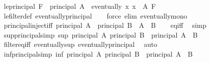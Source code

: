 \begin{isabellebody}
\endisatagproof
{\isafoldproof}%
%
\isadelimproof
\isanewline
%
\endisadelimproof
\isanewline
{}\isamarkupfalse%
\ le{\isacharunderscore}{\kern0pt}principal{\isacharcolon}{\kern0pt}\ {\isachardoublequoteopen}F\ {\isasymle}\ principal\ A\ {\isasymlongleftrightarrow}\ eventually\ {\isacharparenleft}{\kern0pt}{\isasymlambda}x{\isachardot}{\kern0pt}\ x\ {\isasymin}\ A{\isacharparenright}{\kern0pt}\ F{\isachardoublequoteclose}\isanewline
%
\isadelimproof
\ \ %
\endisadelimproof
%
\isatagproof
{}\isamarkupfalse%
\ le{\isacharunderscore}{\kern0pt}filter{\isacharunderscore}{\kern0pt}def\ eventually{\isacharunderscore}{\kern0pt}principal\isanewline
\ \ \isamarkupfalse%
\ {\isacharparenleft}{\kern0pt}force\ elim{\isacharcolon}{\kern0pt}\ eventually{\isacharunderscore}{\kern0pt}mono{\isacharparenright}{\kern0pt}%
\endisatagproof
{\isafoldproof}%
%
\isadelimproof
\isanewline
%
\endisadelimproof
\isanewline
{}\isamarkupfalse%
\ principal{\isacharunderscore}{\kern0pt}inject{\isacharbrackleft}{\kern0pt}iff{\isacharbrackright}{\kern0pt}{\isacharcolon}{\kern0pt}\ {\isachardoublequoteopen}principal\ A\ {\isacharequal}{\kern0pt}\ principal\ B\ {\isasymlongleftrightarrow}\ A\ {\isacharequal}{\kern0pt}\ B{\isachardoublequoteclose}\isanewline
%
\isadelimproof
\ \ %
\endisadelimproof
%
\isatagproof
{}\isamarkupfalse%
\ eq{\isacharunderscore}{\kern0pt}iff\ \isamarkupfalse%
\ simp%
\endisatagproof
{\isafoldproof}%
%
\isadelimproof
\isanewline
%
\endisadelimproof
\isanewline
{}\isamarkupfalse%
\ sup{\isacharunderscore}{\kern0pt}principal{\isacharbrackleft}{\kern0pt}simp{\isacharbrackright}{\kern0pt}{\isacharcolon}{\kern0pt}\ {\isachardoublequoteopen}sup\ {\isacharparenleft}{\kern0pt}principal\ A{\isacharparenright}{\kern0pt}\ {\isacharparenleft}{\kern0pt}principal\ B{\isacharparenright}{\kern0pt}\ {\isacharequal}{\kern0pt}\ principal\ {\isacharparenleft}{\kern0pt}A\ {\isasymunion}\ B{\isacharparenright}{\kern0pt}{\isachardoublequoteclose}\isanewline
%
\isadelimproof
\ \ %
\endisadelimproof
%
\isatagproof
{}\isamarkupfalse%
\ filter{\isacharunderscore}{\kern0pt}eq{\isacharunderscore}{\kern0pt}iff\ eventually{\isacharunderscore}{\kern0pt}sup\ eventually{\isacharunderscore}{\kern0pt}principal\ \isamarkupfalse%
\ auto%
\endisatagproof
{\isafoldproof}%
%
\isadelimproof
\isanewline
%
\endisadelimproof
\isanewline
{}\isamarkupfalse%
\ inf{\isacharunderscore}{\kern0pt}principal{\isacharbrackleft}{\kern0pt}simp{\isacharbrackright}{\kern0pt}{\isacharcolon}{\kern0pt}\ {\isachardoublequoteopen}inf\ {\isacharparenleft}{\kern0pt}principal\ A{\isacharparenright}{\kern0pt}\ {\isacharparenleft}{\kern0pt}principal\ B{\isacharparenright}{\kern0pt}\ {\isacharequal}{\kern0pt}\ principal\ {\isacharparenleft}{\kern0pt}A\ {\isasyminter}\ B{\isacharparenright}{\kern0pt}{\isachardoublequoteclose}\isanewline

\end{isabellebody}
